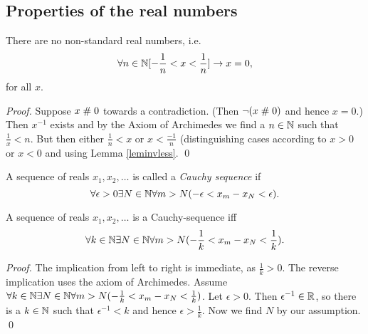 \subsection{Properties of the real numbers}
\begin{lemma}\label{lemnonstand}
There are no non-standard real numbers, i.e.
$$\forall n\in \mathbb{N}[ -\frac{1}{n} < x <\frac{1}{n}] \rightarrow x = 0,$$
for all $x$. 
\end{lemma}

\begin{proof}
Suppose $x \mathrel{\#} 0$ towards a contradiction. (Then $\neg
(x\mathrel{\#} 0)$ and hence $x = 0$.) Then $x^{-1}$ exists and by the Axiom
of Archimedes we find a $n\in \mathbb{N}$ such that $\frac{1}{x} < n$. But
then either $\frac{1}{n} < x$ or $x <\frac{-1}{n}$ (distinguishing
cases according to $x>0$ or $x<0$ and using Lemma
\ref{leminvless}. \qed
\end{proof}

\begin{definition} A sequence of reals $x_1, x_2,\ldots$ is called a
{\em Cauchy sequence\/} if 
$$\forall \epsilon>0 \exists N\in\mathbb{N} \forall
m>N(-\epsilon < x_m - x_N <  \epsilon).$$ 
\end{definition}

\begin{lemma}\label{lemCauchy} A sequence of reals $x_1, x_2,\ldots$ is
a Cauchy-sequence iff
$$\forall k\in\mathbb{N} \exists N\in\mathbb{N} \forall m>N(-\frac{1}{k} <x_m - x_N <
        \frac{1}{k}).$$
\end{lemma}

\begin{proof} The implication from left to right is immediate, as
$\frac{1}{k} >0$. The reverse implication uses the axiom of
Archimedes. Assume $\forall k\in\mathbb{N} \exists N\in\mathbb{N} \forall
m>N(-\frac{1}{k} <x_m - x_N <
        \frac{1}{k})$.
Let $\epsilon > 0$. Then $ \epsilon^{-1} \in \mathbb{R}$, so
there is a $k\in\mathbb{N}$ such that $\epsilon^{-1} < k$ and hence
$\epsilon > \frac{1}{k}$. Now we find $N$ by our assumption. \qed
\end{proof}


